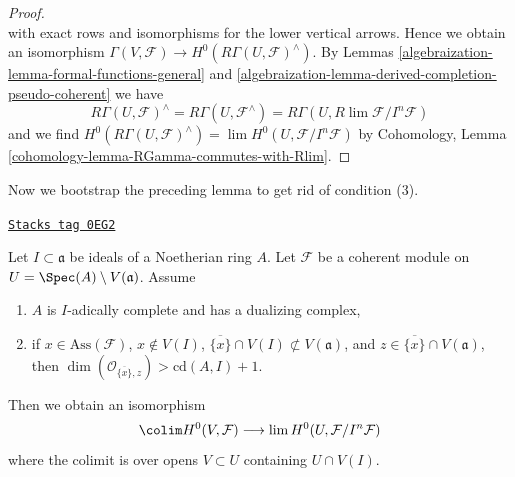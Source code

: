 \begin{proof}
$$$$
with exact rows and isomorphisms for the lower vertical arrows. Hence
we obtain an isomorphism
$\Gamma(V, \mathcal{F}) \to H^0(R\Gamma(U, \mathcal{F})^\wedge)$.
By Lemmas \ref{algebraization-lemma-formal-functions-general}
and \ref{algebraization-lemma-derived-completion-pseudo-coherent} we have
$$
R\Gamma(U, \mathcal{F})^\wedge =
R\Gamma(U, \mathcal{F}^\wedge) =
R\Gamma(U, R\lim \mathcal{F}/I^n\mathcal{F})
$$
and we find $H^0(R\Gamma(U, \mathcal{F})^\wedge) =
\lim H^0(U, \mathcal{F}/I^n\mathcal{F})$ by
Cohomology, Lemma \ref{cohomology-lemma-RGamma-commutes-with-Rlim}.
\end{proof}

Now we bootstrap the preceding lemma to get rid of condition (3).

\begin{proposition}[Application H0]
\label{algebraization-proposition-application-H0}
\href{https://stacks.math.columbia.edu/tag/0EG2}{\texttt{Stacks tag 0EG2}}

Let $I \subset \mathfrak a$ be ideals of a Noetherian ring $A$.
Let $\mathcal{F}$ be a coherent module on
$U = \Spec(A) \setminus V(\mathfrak a)$.
Assume
\begin{enumerate}
\item $A$ is $I$-adically complete and has a dualizing complex,
\item if $x \in \text{Ass}(\mathcal{F})$, $x \not \in V(I)$,
$\overline{\{x\}} \cap V(I) \not \subset V(\mathfrak a)$,
and $z \in \overline{\{x\}} \cap V(\mathfrak a)$, then
$\dim(\mathcal{O}_{\overline{\{x\}}, z}) > \text{cd}(A, I) + 1$.
\end{enumerate}
Then we obtain an isomorphism
$$
\colim H^0(V, \mathcal{F})
\longrightarrow
\lim H^0(U, \mathcal{F}/I^n\mathcal{F})
$$
where the colimit is over opens $V \subset U$ containing $U \cap V(I)$.
\end{proposition}

